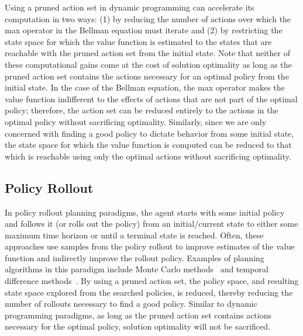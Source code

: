 \documentclass[]{article}
\newcommand{\stnote}[1]{\textcolor{Blue}{\textbf{ST: #1}}}
\newcommand{\dnote}[1]{\textcolor{Orange}{\textbf{D: #1}}}
\begin{document}
Using a pruned action set in dynamic programming can accelerate its
computation in two ways: (1) by reducing the number of actions over
which the max operator in the Bellman equation must iterate and (2) by
restricting the state space for which the value function is estimated
to the states that are reachable with the pruned action set from the
initial state. Note that neither of these computational gains come at
the cost of solution optimality as long as the pruned action set
contains the actions necessary for an optimal policy from the initial
state. In the case of the Bellman equation, the max operator makes the
value function indifferent to the effects of actions that are not part
of the optimal policy; therefore, the action set can be reduced
entirely to the actions in the optimal policy without sacrificing
optimality. Similarly, since we are only concerned with finding a good
policy to dictate behavior from some initial state, the state space
for which the value function is computed can be reduced to that which
is reachable using only the optimal actions without sacrificing
optimality.  

\subsection{Policy Rollout}

In policy rollout planning paradigms, the agent starts with some
initial policy and follows it (or rolls out the policy) from an
initial/current state to either some maximum time horizon or until a
terminal state is reached. Often, these approaches use samples from
the policy rollout to improve estimates of the value function and
indirectly improve the rollout policy. Examples of planning algorithms
in this paradigm include Monte Carlo methods~\citep{browne12,
  silver10} and temporal difference
methods~\citep{sutton99,sutton1988lpm,rummery1994line,6313077,lagoudakis2003least,Peters:2008ve}.
By using a pruned
action set, the policy space, and resulting state space explored from
the searched policies, is reduced, thereby reducing the number of
rollouts necessary to find a good policy. Similar to dynamic
programming paradigms, as long as the pruned action set contains
actions necessary for the optimal policy, solution optimality will not
be sacrificed.
\end{document}
